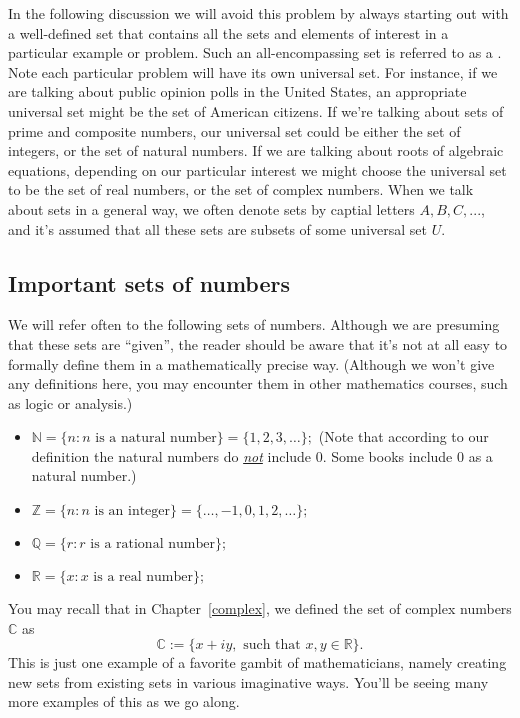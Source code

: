 In the following discussion we will avoid this problem by always starting out with a well-defined set that contains all the sets and elements of interest in a particular example or problem. Such an all-encompassing set is referred to as a . Note each particular problem will have its own universal set. For instance, if we are talking about public opinion polls  in the United States, an appropriate universal set might be the set of American citizens. If we're talking about sets of prime and composite numbers, our universal set could be either the set of integers, or the set of natural numbers. If we are talking about roots of algebraic equations, depending on our particular interest we might choose the universal set to be the set of real numbers, or the set of complex numbers. When we talk about sets in a general way, we often denote sets by captial  letters $A, B, C,...$, and it's assumed that all these sets are subsets of some universal set $U$.

\subsection{Important sets of numbers}
We will refer often to the following sets of numbers. Although we are presuming that these sets are ``given'', the reader should be aware that it's not at all easy to formally define them in a mathematically precise way.  (Although we won't give any definitions here,  you may encounter them in other mathematics courses, such as logic or analysis.)
\begin{itemize}
\item
${\mathbb N}\label{naturalnum}  = \{n: n \text{ is a natural number}\}  = \{1, 2, 3, \ldots \};$ (Note that according to our definition the natural numbers do \emph{\underline{not}} include $0$. Some books include $0$ as a natural number.) 
\item
${\mathbb Z}\label{sets_integers}  = \{n : n \text{ is an integer} \} = \{\ldots, -1, 0, 1,  2, \ldots \};$
\item
${\mathbb Q}\label{rationals} = \{r : r \text{ is a rational number}\};$
\item
${\mathbb R}\label{reals} = \{ x : x \text{ is a real number} \};$
\end{itemize}

You may recall that in  Chapter~\ref{complex}, we defined  the set of complex numbers ${\mathbb C}$ as
\[ {\mathbb C} := \{ x + iy, \text{ such that } x,y \in {\mathbb R} \}. \] 
This is just one example of a favorite gambit of mathematicians, namely creating new sets from existing sets in various imaginative ways. You'll be seeing many more examples of this as we go along.


